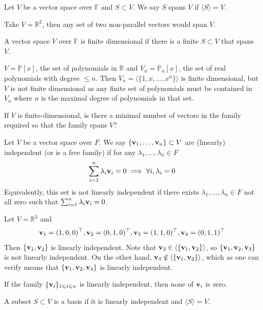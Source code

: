 \documentclass[a4paper]{article}
\begin{document}
\begin{definition}
    Let $V$ be a vector space over $\mathbb F$ and $S\subset V$.
    We say $S$ spans $V$ if $\langle S\rangle =V$.
\end{definition}
\begin{example}
    Take $V=\mathbb R^2$, then any set of two non-parallel vectors would span $V$.
\end{example}
\begin{definition}
    A vector space $V$ over $\mathbb F$ is finite dimensional if there is a finite $S\subset V$ that spans $V$.
\end{definition}
\begin{example}
    $V=\mathbb P[x]$, the set of polynomials in $\mathbb R$ and $V_n=\mathbb P_n[x]$, the set of real polynomials with degree $\le n$.
    Then $V_n=\langle\{1,x,\ldots,x^n\}\rangle$ is finite dimensional, but $V$ is not finite dimensional as any finite set of polynomials must be contained in $V_n$ where $n$ is the maximal degree of polynomials in that set.
\end{example}
If $V$ is finite-dimensional, is there a minimal number of vectors in the family required so that the family spans $V$?
\begin{definition}
    Let $V$ be a vector space over $F$.
    We say $\{{\bf v}_1,\ldots,{\bf v}_n\}\subset V$ are (linearly) independent (or is a free family) if for any $\lambda_1,\ldots,\lambda_n\in F$
    $$\sum_{i=1}^n\lambda_i{\bf v}_i=0\implies\forall i,\lambda_i=0$$
    Equivalently, this set is not linearly independent if there exists $\lambda_1,\ldots,\lambda_n\in F$ not all zero such that $\sum_{i=1}^n\lambda_i{\bf v}_i=0$.
\end{definition}
\begin{example}
Let $V=\mathbb R^3$ and
$${\bf v}_1=(1,0,0)^\top,{\bf v}_2=(0,1,0)^\top,{\bf v}_3=(1,1,0)^\top,{\bf v}_4=(0,1,1)^\top$$
Then $\{{\bf v}_1,{\bf v}_2\}$ is linearly independent.
Note that ${\bf v}_3\in\langle\{{\bf v}_1,{\bf v}_2\}\rangle$, so $\{{\bf v}_1,{\bf v}_2,{\bf v}_3\}$ is not linearly independent.
On the other hand, ${\bf v}_4\notin\langle\{{\bf v}_1,{\bf v}_2\}\rangle$, which as one can verify means that $\{{\bf v}_1,{\bf v}_2,{\bf v}_4\}$ is linearly independent.
\end{example}
\begin{remark}
    If the family $\{{\bf v}_i\}_{1\leqslant i\leqslant n}$ is linearly independent, then none of ${\bf v}_i$ is zero.
\end{remark}
\begin{definition}[Basis]
    A subset $S\subset V$ is a basis if it is linearly independent and $\langle S\rangle=V$.
\end{definition}
\end{document}
